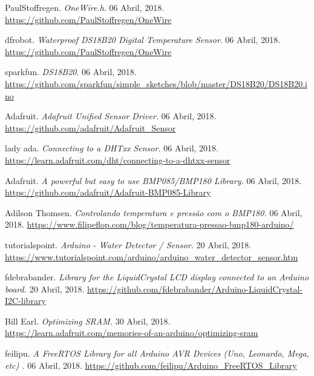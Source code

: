 \documentclass[11pt]{report}
\begin{document}
\begin{thebibliography}{2}

	 PaulStoffregen. \emph{OneWire.h}.  06 Abril, 2018. 
	\url{https://github.com/PaulStoffregen/OneWire}


	dfrobot. \emph{Waterproof DS18B20 Digital Temperature Sensor}.  06 Abril, 2018. 
	\url{https://github.com/PaulStoffregen/OneWire}


	sparkfun. \emph{DS18B20}.  06 Abril, 2018. 
	\url{https://github.com/sparkfun/simple_sketches/blob/master/DS18B20/DS18B20.ino}

	 Adafruit. \emph{Adafruit Unified Sensor Driver.}  06 Abril, 2018. 
	\url{https://github.com/adafruit/Adafruit_Sensor}

	 lady ada. \emph{Connecting to a DHTxx Sensor.}  06 Abril, 2018. 
	\url{https://learn.adafruit.com/dht/connecting-to-a-dhtxx-sensor}


	Adafruit. \emph{A powerful but easy to use BMP085/BMP180 Library.}  06 Abril, 2018. 
	\url{https://github.com/adafruit/Adafruit-BMP085-Library}


	 Adilson Thomsen. \emph{Controlando temperatura e pressão com o BMP180.}  06 Abril, 2018. 
	\url{https://www.filipeflop.com/blog/temperatura-pressao-bmp180-arduino/}


	 tutorialspoint. \emph{Arduino - Water Detector / Sensor.}  20 Abril, 2018. 
	\url{https://www.tutorialspoint.com/arduino/arduino_water_detector_sensor.htm}


	 fdebrabander. \emph{Library for the LiquidCrystal LCD display connected to an Arduino board.}  20 Abril, 2018. 
	\url{https://github.com/fdebrabander/Arduino-LiquidCrystal-I2C-library}


	 Bill Earl. \emph{Optimizing SRAM.}  30 Abril, 2018. 
	\url{https://learn.adafruit.com/memories-of-an-arduino/optimizing-sram}

	 feilipu. \emph{A FreeRTOS Library for all Arduino AVR Devices (Uno, Leonardo, Mega, etc) .}  06 Abril, 2018. 
	\url{https://github.com/feilipu/Arduino_FreeRTOS_Library}



\end{thebibliography}
\end{document}
